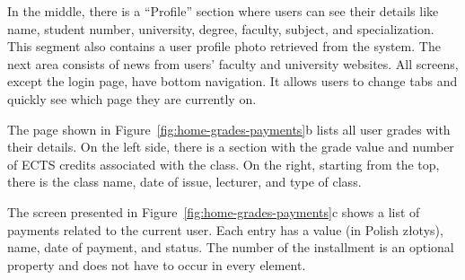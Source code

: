 In the middle, there is a ``Profile'' section where users can see their details like name, student number, university, degree, faculty, subject, and specialization. This segment also contains a user profile photo retrieved from the system. The next area consists of news from users' faculty and university websites.
All screens, except the login page, have bottom navigation. It allows users to change tabs and quickly see which page they are currently on.

The page shown in Figure~\ref{fig:home-grades-payments}b lists all user grades with their details. On the left side, there is a section with the grade value and number of ECTS credits associated with the class. On the right, starting from the top, there is the class name, date of issue, lecturer, and type of class.

The screen presented in  Figure~\ref{fig:home-grades-payments}c shows a list of payments related to the current user. Each entry has a value (in Polish złotys), name, date of payment, and status. The number of the installment is an optional property and does not have to occur in every element.

